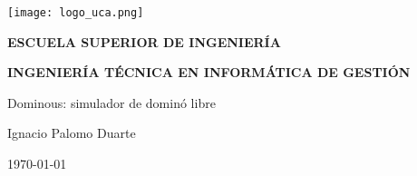 

\begin{titlepage}

  \begin{center}

    \texttt{[image: logo\_uca.png]} \\
    
    \vspace{2.0cm}
    
    \LARGE{\textbf{ESCUELA SUPERIOR DE INGENIERÍA}} \\
    
    \vspace{1.0cm}
    
    \Large{\textbf{INGENIERÍA TÉCNICA EN INFORMÁTICA DE GESTIÓN}} \\
    
    \vspace{3.0cm}
    
    \Large{Dominous: simulador de dominó libre} \\
    
    \vspace{2.0cm}
    
    \Large{Ignacio Palomo Duarte} \\
  
    \vspace{0.5cm}

    \large{\today}
    
  \end{center}
\end{titlepage}
